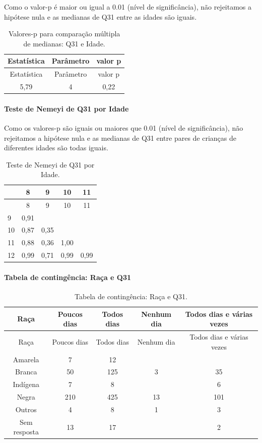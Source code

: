 \documentclass[]{article}
\let\oldparagraph\paragraph
\renewcommand{\paragraph}[1]{\oldparagraph{#1}\mbox{}}
\begin{document}
Como o valor-p é maior ou igual a 0.01 (nível de significância), não rejeitamos a hipótese nula e as medianas de Q31 entre as idades são iguais.

\begin{longtable}[]{@{}ccc@{}}
\caption{\label{tab:unnamed-chunk-1043}Valores-p para comparação múltipla de medianas: Q31 e Idade.}\tabularnewline
\toprule
Estatística & Parâmetro & valor p\tabularnewline
\midrule
\endfirsthead
\toprule
Estatística & Parâmetro & valor p\tabularnewline
\midrule
\endhead
5,79 & 4 & 0,22\tabularnewline
\bottomrule
\end{longtable}

\hypertarget{teste-de-nemeyi-de-q31-por-idade}{%
\paragraph{Teste de Nemeyi de Q31 por Idade}\label{teste-de-nemeyi-de-q31-por-idade}}

Como os valores-p são iguais ou maiores que 0.01 (nível de significância), não rejeitamos a hipótese nula e as medianas de Q31 entre pares de crianças de diferentes idades são todas iguais.

\begin{longtable}[]{@{}lcccc@{}}
\caption{\label{tab:unnamed-chunk-1045}Teste de Nemeyi de Q31 por Idade.}\tabularnewline
\toprule
& 8 & 9 & 10 & 11\tabularnewline
\midrule
\endfirsthead
\toprule
& 8 & 9 & 10 & 11\tabularnewline
\midrule
\endhead
9 & 0,91 & & &\tabularnewline
10 & 0,87 & 0,35 & &\tabularnewline
11 & 0,88 & 0,36 & 1,00 &\tabularnewline
12 & 0,99 & 0,71 & 0,99 & 0,99\tabularnewline
\bottomrule
\end{longtable}

\cleardoublepage

\hypertarget{tabela-de-continguxeancia-rauxe7a-e-q31}{%
\paragraph{Tabela de contingência: Raça e Q31}\label{tabela-de-continguxeancia-rauxe7a-e-q31}}

\begin{longtable}[]{@{}ccccc@{}}
\caption{\label{tab:unnamed-chunk-1046}Tabela de contingência: Raça e Q31.}\tabularnewline
\toprule
Raça & Poucos dias & Todos dias & Nenhum dia & Todos dias e várias vezes\tabularnewline
\midrule
\endfirsthead
\toprule
Raça & Poucos dias & Todos dias & Nenhum dia & Todos dias e várias vezes\tabularnewline
\midrule
\endhead
Amarela & 7 & 12 & &\tabularnewline
Branca & 50 & 125 & 3 & 35\tabularnewline
Indígena & 7 & 8 & & 6\tabularnewline
Negra & 210 & 425 & 13 & 101\tabularnewline
Outros & 4 & 8 & 1 & 3\tabularnewline
Sem resposta & 13 & 17 & & 2\tabularnewline
\bottomrule
\end{longtable}
\end{document}

